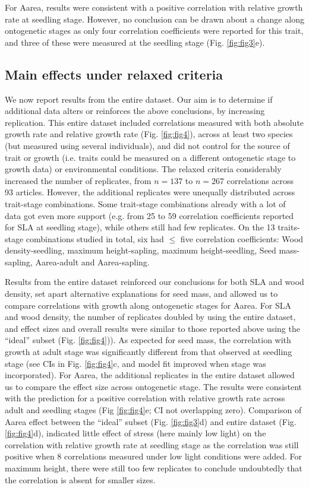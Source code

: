 \documentclass[a4paper,11pt]{article}
\begin{document}
For Aarea, results were consistent with a positive correlation with relative growth rate at seedling stage. However, no conclusion can be drawn about a change along ontogenetic stages as only four correlation coefficients were reported for this trait, and three of these were measured at the seedling stage (Fig. \ref{fig:fig3}e).


\subsection*{Main effects under relaxed criteria}

We now report results from the entire dataset. Our aim is to determine if additional data alters or reinforces the above conclusions, by increasing replication. This entire dataset included correlations measured with both absolute growth rate and relative growth rate (Fig. \ref{fig:fig4}), across at least two species (but measured using several individuals), and did not control for the source of trait or growth (i.e. traits could be measured on a different ontogenetic stage to growth data) or environmental conditions. The relaxed criteria considerably increased the number of replicates, from $n = 137$ to $n = 267$ correlations across 93 articles. However, the additional replicates were unequally distributed across trait-stage combinations. Some trait-stage combinations already with a lot of data got even more support (e.g. from 25 to 59 correlation coefficients reported for SLA at seedling stage), while others still had few replicates. On the 13 traits-stage combinations studied in total, six had $\le$ five correlation coefficients: Wood density-seedling, maximum height-sapling, maximum height-seedling, Seed mass-sapling, Aarea-adult and Aarea-sapling.

Results from the entire dataset reinforced our conclusions for both SLA and wood density, set apart alternative explanations for seed mass, and allowed us to compare correlations with growth along ontogenetic stages for Aarea. For SLA and wood density, the number of replicates doubled by using the entire dataset, and effect sizes and overall results were similar to those reported above using the ``ideal'' subset (Fig. \ref{fig:fig4})). As expected for seed mass, the correlation with growth at adult stage was significantly different from that observed at seedling stage (see CIs in Fig. \ref{fig:fig4}c, and model fit improved when stage was incorporated). For Aarea, the additional replicates in the entire dataset allowed us to compare the effect size across ontogenetic stage. The results were consistent with the prediction for a positive correlation with relative growth rate across adult and seedling stages (Fig \ref{fig:fig4}e; CI not overlapping zero). Comparison of Aarea effect between the ``ideal'' subset (Fig. \ref{fig:fig3}d) and entire dataset (Fig. \ref{fig:fig4}d), indicated little effect of stress (here mainly low light) on the correlation with relative growth rate at seedling stage as the correlation was still positive when 8 correlations measured under low light conditions were added. For maximum height, there were still too few replicates to conclude undoubtedly that the correlation is absent for smaller sizes.
\end{document}
